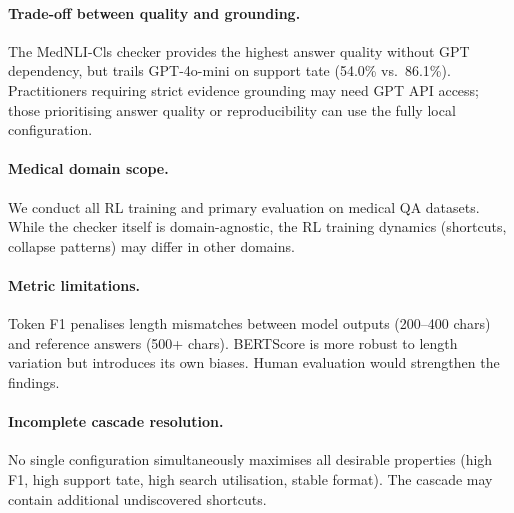 \documentclass[11pt]{article}
\begin{document}
\paragraph{Trade-off between quality and grounding.}
The MedNLI-Cls checker provides the highest 
answer quality without GPT dependency, but trails 
GPT-4o-mini on support tate (54.0\% vs.\ 86.1\%). 
Practitioners requiring strict evidence grounding may 
need GPT API access; those prioritising answer quality 
or reproducibility can use the fully local 
configuration.

\paragraph{Medical domain scope.}
We conduct all RL training and primary evaluation on medical QA datasets.
While the checker itself is domain-agnostic, the RL training dynamics (shortcuts, collapse patterns) may differ in other domains.

\paragraph{Metric limitations.}
Token F1 penalises length mismatches between model outputs (200--400 chars) and reference answers (500+ chars).
BERTScore is more robust to length variation but introduces its own biases.
Human evaluation would strengthen the findings.

\paragraph{Incomplete cascade resolution.}
No single configuration simultaneously maximises all desirable properties (high F1, high support tate, high search utilisation, stable format).
The cascade may contain additional undiscovered shortcuts.

\end{document}
